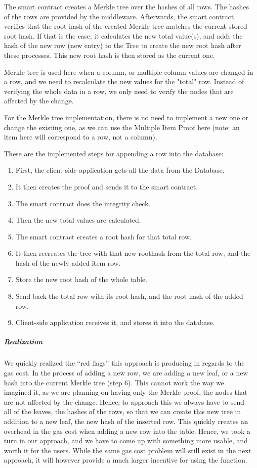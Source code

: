 The smart contract creates a Merkle tree over the hashes of all rows. The hashes of the rows are provided by the middleware. Afterwards, the smart contract verifies that the root hash of the created Merkle tree matches the current stored root hash. If that is the case, it calculates the new total value(s), and adds the hash of the new row (new entry) to the Tree to create the new root hash after these processes. This new root hash is then stored as the current one.

Merkle tree is used here when a column, or multiple column values are changed in a row, and we need to recalculate the new values for the "total" row. Instead of verifying the whole data in a row, we only need to verify the nodes that are affected by the change.

For the Merkle tree implementation, there is no need to implement a new one or change the existing one, as we can use the Multiple Item Proof here (note: an item here will correspond to a row, not a column).

These are the implemented steps for appending a row into the database: 
\begin{enumerate}
	\item First, the client-side application gets all the data from the Database.
	\item It then creates the proof and sends it to the smart contract.
	\item The smart contract does the integrity check.
	\item Then the new total values are calculated.
	\item The smart contract creates a root hash for that total row.
	\item It then recreates the tree with that new roothash from the total row, and the hash of the newly added item row.
	\item Store the new root hash of the whole table.
	\item Send back the total row with its root hash, and the root hash of the added row.
	\item Client-side application receives it, and stores it into the database. 
\end{enumerate}

\subparagraph{Realization}

We quickly realized the “red flags” this approach is producing in regards to the gas cost. In the process of adding a new row, we are adding a new leaf, or a new hash into the current Merkle tree (step 6). This cannot work the way we imagined it, as we are planning on having only the Merkle proof, the nodes that are not affected by the change. Hence, to approach this we always have to send all of the leaves, the hashes of the rows, so that we can create this new tree in addition to a new leaf, the new hash of the inserted row. This quickly creates an overhead in the gas cost when adding a new row into the table. Hence, we took a turn in our approach, and we have to come up with something more usable, and worth it for the users. While the same gas cost problem will still exist in the next approach, it will however provide a much larger incentive for using the function. 

